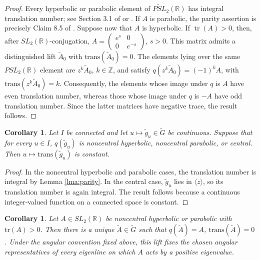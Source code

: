 \documentclass{article}
\DeclareMathOperator{\tr}{tr}
\theoremstyle{plain}
\theoremstyle{definition}
\theoremstyle{plain}
\theoremstyle{plain}
\newtheorem{corollary}[theorem]{Corollary}
\theoremstyle{plain}
\theoremstyle{remark}
\theoremstyle{remark}
\theoremstyle{plain}
\theoremstyle{plain}
\theoremstyle{plain}
\theoremstyle{plain}
\begin{document}
\begin{proof}
Every hyperbolic or parabolic element of $\widetilde{PSL}_2(\mathbb{R})$ has integral translation number; see Section 3.1 of \cite{cullerdunfield} or \cite{ghys}. If $A$ is parabolic, the parity assertion is precisely Claim 8.5 of \cite{cullerdunfield}. Suppose now that $A$ is hyperbolic. If $\tr(A) > 0$, then, after $SL_2(\mathbb{R})$-conjugation, $A = \left(\begin{smallmatrix}e^s & 0 \\ 0 & e^{-s}\end{smallmatrix}\right)$, $s > 0$. This matrix admits a distinguished lift $\widetilde{A}_0$ with $\mathrm{trans}(\widetilde{A}_0) = 0$. The elements lying over the same $PSL_2(\mathbb{R})$ element are $z^k\widetilde{A}_0$, $k \in \mathbb{Z}$, and satisfy $q(z^k\widetilde{A}_0) = (-1)^kA$, with $\mathrm{trans}(z^k\widetilde{A}_0) = k$. Consequently, the elements whose image under $q$ is $A$ have even translation number, whereas those whose image under $q$ is $-A$ have odd translation number. Since the latter matrices have negative trace, the result follows. 
\end{proof}

\begin{corollary}\label{cor:translationconstant}
Let $I$ be connected and let $u \mapsto \widetilde g_u \in \widetilde G$ be continuous. Suppose that for every $u \in I$, $q(\widetilde g_u)$ is noncentral hyperbolic, noncentral parabolic, or central. Then $u \mapsto \mathrm{trans}(\widetilde g_u)$ is constant.
\end{corollary}

\begin{proof}
In the noncentral hyperbolic and parabolic cases, the translation number is integral by Lemma \ref{lma:parity}. In the central case, $\widetilde g_u$ lies in $\langle z \rangle$, so its translation number is again integral. The result follows because a continuous integer-valued function on a connected space is constant. 
\end{proof}

\begin{corollary}\label{cor:zerotranslift}
Let $A \in SL_2(\mathbb{R})$ be noncentral hyperbolic or parabolic with $\mathrm{tr}(A) > 0$. Then there is a unique $\widetilde A \in \widetilde G$ such that $q(\widetilde A) = A$, $\mathrm{trans}(\widetilde{A}) = 0$. Under the angular convention fixed above, this lift fixes the chosen angular representatives of every eigenline on which $A$ acts by a positive eigenvalue.
\end{corollary}
\end{document}
